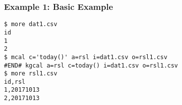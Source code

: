 \subsubsection*{Example 1: Basic Example}



\begin{Verbatim}[baselinestretch=0.7,frame=single]
$ more dat1.csv
id
1
2
$ mcal c='today()' a=rsl i=dat1.csv o=rsl1.csv
#END# kgcal a=rsl c=today() i=dat1.csv o=rsl1.csv
$ more rsl1.csv
id,rsl
1,20171013
2,20171013
\end{Verbatim}
